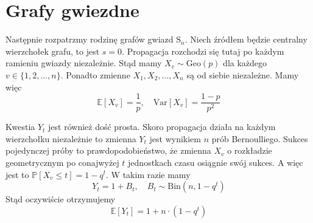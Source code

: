 \section{Grafy gwiezdne}

Następnie rozpatrzmy rodzinę grafów gwiazd $\mathrm{S}_n$. Niech źródłem będzie centralny wierzchołek grafu, to jest $s=0$. Propagacja rozchodzi się tutaj po każdym ramieniu gwiazdy niezależnie. Stąd mamy $X_v \sim \mathrm{Geo}(p)$ dla każdego $v\in\{1,2,\dots,n\}$. Ponadto zmienne $X_1,X_2,\dots,X_n$ są od siebie niezależne. Mamy więc
\[
    \mathbb{E}[X_v]=\frac{1}{p}, \quad \mathrm{Var}[X_v]=\frac{1-p}{p^2}
\]

Kwestia $Y_t$ jest również dość prosta. Skoro propagacja działa na każdym wierzchołku niezależnie to zmienna $Y_t$ jest wynikiem $n$ prób Bernoulliego. Sukces pojedynczej próby to prawdopodobieństwo, że zmienna $X_v$ o rozkładzie geometrycznym po conajwyżej $t$ jednostkach czasu osiągnie swój sukces. A więc jest to $\mathbb{P}[X_v\le t]=1-q^t$. W takim razie mamy
\[
    Y_t = 1 + B_t, \quad B_t \sim \mathrm{Bin}(n, 1-q^t)
\]
Stąd oczywiście otrzymujemy 
\[
    \mathbb{E}[Y_t] = 1 + n\cdot (1-q^t)
\]

